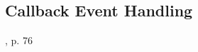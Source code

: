 %
%
%
%
%
%
%

\subsection{Callback Event Handling}
\label{callback_event_handling_heading}

\cite{steppan}, p. 76


